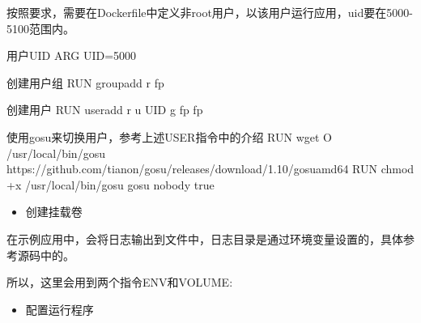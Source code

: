 \documentclass[letterpaper,10pt,english]{sphinxmanual}
\begin{document}
按照要求，需要在Dockerfile中定义非root用户，以该用户运行应用，uid要在5000-5100范围内。

\begin{sphinxVerbatim}[commandchars=\\\{\}]
\PYGZsh{}\PYGZsh{} 用户UID
ARG UID=5000

\PYGZsh{}\PYGZsh{} 创建用户组
RUN groupadd \PYGZhy{}r fp

\PYGZsh{}\PYGZsh{} 创建用户
RUN useradd \PYGZhy{}r \PYGZhy{}u \PYGZdl{}UID \PYGZhy{}g fp fp

\PYGZsh{}\PYGZsh{} 使用gosu来切换用户，参考上述USER指令中的介绍
RUN wget \PYGZhy{}O /usr/local/bin/gosu \PYGZdq{}https://github.com/tianon/gosu/releases/download/1.10/gosu\PYGZhy{}amd64\PYGZdq{}
RUN chmod +x /usr/local/bin/gosu \PYGZam{}\PYGZam{} gosu nobody true
\end{sphinxVerbatim}
\begin{itemize}
\item {} 
创建挂载卷

\end{itemize}

在示例应用中，会将日志输出到文件中，日志目录是通过环境变量设置的，具体参考源码中的。

所以，这里会用到两个指令\textendash{}ENV和VOLUME:

\begin{sphinxVerbatim}[commandchars=\\\{\}]
 

  

   

 
\end{sphinxVerbatim}
\begin{itemize}
\item {} 
配置运行程序

\end{itemize}
\end{document}
